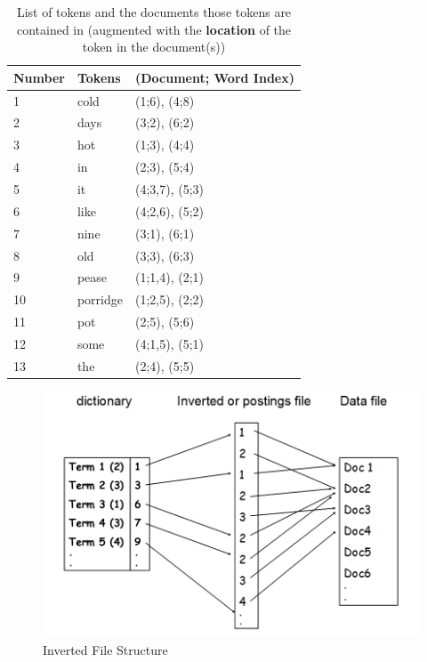 \documentclass{article}
\begin{document}
\begin{table}
	\centering
	\begin{tabular}{|l|l|l|}
		\hline
		\textbf{Number} & \textbf{Tokens} & \textbf{(Document; Word Index)} \\
		\hline		
		1 & cold & (1;6), (4;8) \\
		2 & days & (3;2), (6;2) \\
		3 & hot & (1;3), (4;4) \\
		4 & in & (2;3), (5;4) \\
		5 & it & (4;3,7), (5;3) \\
		6 & like & (4;2,6), (5;2) \\
		7 & nine & (3;1), (6;1) \\
		8 & old & (3;3), (6;3) \\
		9 & pease & (1;1,4), (2;1) \\
		10 & porridge & (1;2,5), (2;2) \\		
		11 & pot & (2;5), (5;6) \\
		12 & some & (4;1,5), (5;1) \\
		13 & the & (2;4), (5;5) \\	
		\hline
	\end{tabular}
	\caption{List of tokens and the documents those tokens are contained in (augmented with the \textbf{location} of the token in the document(s))}
	\label{tab:word-doc-sophisticated}
\end{table}

\begin{figure}
	\centering
	\includegraphics[scale=0.4]{figures/inverted-file-structure.png}
	\caption{Inverted File Structure}
	\label{fig:inverted-file-structure}
\end{figure}
\end{document}
